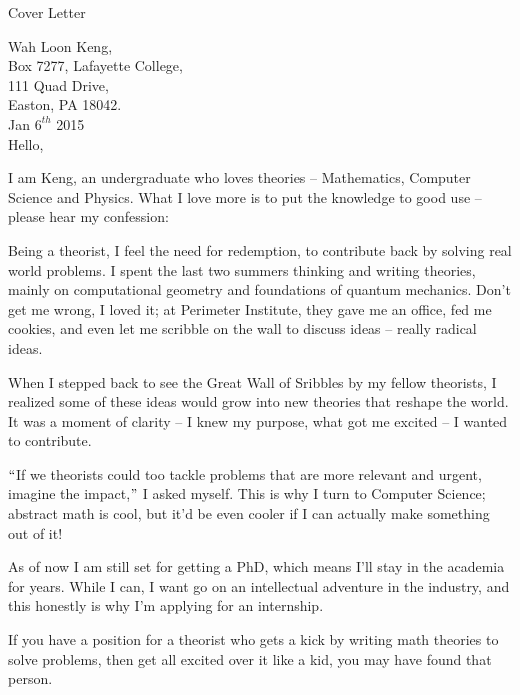\documentclass{resume} %
\begin{document}
\begin{rSection}{Cover Letter}


\end{rSection}


Wah Loon Keng,\\
Box 7277, Lafayette College,\\
111 Quad Drive,\\
Easton, PA 18042.\\

Jan $6^{th}$ 2015\\


Hello,

I am Keng, an undergraduate who loves theories $–$ Mathematics, Computer Science and Physics. What I love more is to put the knowledge to good use $–$ please hear my confession:

Being a theorist, I feel the need for redemption, to contribute back by solving real world problems. I spent the last two summers thinking and writing theories, mainly on computational geometry and foundations of quantum mechanics. Don't get me wrong, I loved it; at Perimeter Institute, they gave me an office, fed me cookies, and even let me scribble on the wall to discuss ideas $–$ really radical ideas.

When I stepped back to see the Great Wall of Sribbles by my fellow theorists, I realized some of these ideas would grow into new theories that reshape the world. It was a moment of clarity $–$ I knew my purpose, what got me excited $–$ I wanted to contribute.

$``$If we theorists could too tackle problems that are more relevant and urgent, imagine the impact,$"$ I asked myself. This is why I turn to Computer Science; abstract math is cool, but it'd be even cooler if I can actually make something out of it!

As of now I am still set for getting a PhD, which means I'll stay in the academia for years. While I can, I want go on an intellectual adventure in the industry, and this honestly is why I'm applying for an internship. 

If you have a position for a theorist who gets a kick by writing math theories to solve problems, then get all excited over it like a kid, you may have found that person.
\end{document}
